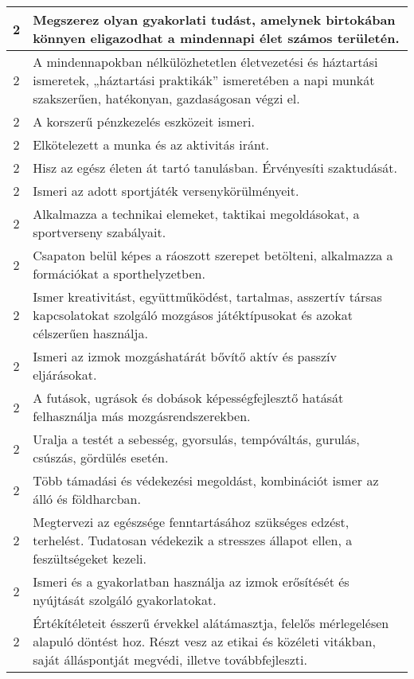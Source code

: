 \begin{longtable}{c | p{12cm} }
                                
                                          2 &  Megszerez olyan gyakorlati tudást, amelynek birtokában könnyen eligazodhat a mindennapi élet számos területén. \\ \hline
                                          2 &  A mindennapokban nélkülözhetetlen életvezetési és háztartási ismeretek, „háztartási praktikák” ismeretében a napi munkát szakszerűen, hatékonyan, gazdaságosan végzi el. \\ \hline
                                          2 &  A korszerű pénzkezelés eszközeit ismeri. \\ \hline
                                          2 &  Elkötelezett a munka és az aktivitás iránt. \\ \hline
                                          2 &  Hisz az egész életen át tartó tanulásban. Érvényesíti szaktudását. \\ \hline
                                          2 &  Ismeri az adott sportjáték versenykörülményeit. \\ \hline
                                          2 &  Alkalmazza a technikai elemeket, taktikai megoldásokat, a sportverseny szabályait. \\ \hline
                                          2 &  Csapaton belül képes a ráoszott szerepet betölteni, alkalmazza a formációkat a sporthelyzetben. \\ \hline
                                          2 &  Ismer kreativitást, együttműködést, tartalmas, asszertív társas kapcsolatokat szolgáló mozgásos játéktípusokat és azokat célszerűen használja. \\ \hline
                                          2 &  Ismeri az izmok mozgáshatárát bővítő aktív és passzív eljárásokat. \\ \hline
                                          2 &  A futások, ugrások és dobások képességfejlesztő hatását felhasználja más mozgásrendszerekben. \\ \hline
                                          2 &  Uralja a testét a sebesség, gyorsulás, tempóváltás, gurulás, csúszás, gördülés esetén. \\ \hline
                                          2 &  Több támadási és védekezési megoldást, kombinációt ismer az álló és földharcban. \\ \hline
                                          2 &  Megtervezi az egészsége fenntartásához szükséges edzést, terhelést. Tudatosan védekezik a stresszes állapot ellen, a feszültségeket kezeli. \\ \hline
                                          2 &  Ismeri és a gyakorlatban használja az izmok erősítését és nyújtását szolgáló gyakorlatokat. \\ \hline
                                          2 &  Értékítéleteit ésszerű érvekkel alátámasztja, felelős mérlegelésen alapuló döntést hoz. Részt vesz az etikai és közéleti vitákban, saját álláspontját megvédi, illetve továbbfejleszti. \\ \hline
                                      

\end{longtable}
